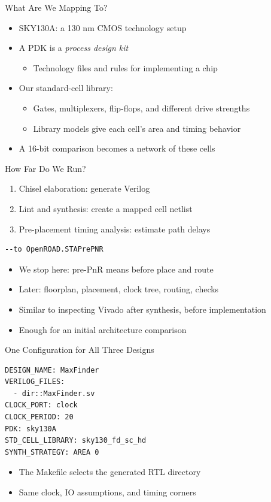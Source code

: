 \begin{frame}{What Are We Mapping To?}
\begin{itemize}
\item SKY130A: a 130 nm CMOS technology setup
\item A PDK is a \emph{process design kit}
\begin{itemize}
\item Technology files and rules for implementing a chip
\end{itemize}
\item Our standard-cell library: 
\begin{itemize}
\item Gates, multiplexers, flip-flops, and different drive strengths
\item Library models give each cell's area and timing behavior
\end{itemize}
\item A 16-bit comparison becomes a network of these cells
\end{itemize}
\end{frame}

\begin{frame}[fragile]{How Far Do We Run?}
\begin{enumerate}
\item Chisel elaboration: generate Verilog
\item Lint and synthesis: create a mapped cell netlist
\item Pre-placement timing analysis: estimate path delays
\end{enumerate}
\begin{lstlisting}[language={}]
--to OpenROAD.STAPrePNR
\end{lstlisting}
\begin{itemize}
\item We stop here: pre-PnR means before place and route
\item Later: floorplan, placement, clock tree, routing, checks
\item Similar to inspecting Vivado after synthesis,
      before implementation
\item Enough for an initial architecture comparison
\end{itemize}
\end{frame}


\begin{frame}[fragile]{One Configuration for All Three Designs}
\begin{lstlisting}[language={}]
DESIGN_NAME: MaxFinder
VERILOG_FILES:
  - dir::MaxFinder.sv
CLOCK_PORT: clock
CLOCK_PERIOD: 20
PDK: sky130A
STD_CELL_LIBRARY: sky130_fd_sc_hd
SYNTH_STRATEGY: AREA 0
\end{lstlisting}
\begin{itemize}
\item The Makefile selects the generated RTL directory
\item Same clock, IO assumptions, and timing corners
\end{itemize}
\end{frame}


